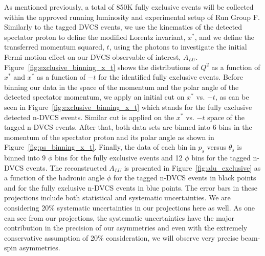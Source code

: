 As mentioned previously, a total of 850K fully exclusive events will be 
collected within the approved running luminosity and experimental setup of Run 
Group F. Similarly to the tagged DVCS events, we use the kinematics of the 
detected spectator proton to define the modified Lorentz invariant, $x^*$, and 
we define the transferred momentum squared, $t$, using the photons to 
investigate the initial Fermi motion effect on our DVCS observable of interest, 
$A_{LU}$. Figure~\ref{fig:exclusive_binning_x_t} shows the distributions of  
$Q^2$ as a function of  $x^*$ and  $x^{*}$ as a function of $-t$ for the 
identified fully exclusive events. Before binning our data in the space of the 
momentum and the polar angle of the detected spectator momentum, we apply an 
initial cut on $x^{*}$ vs. $-t$, as can be seen in 
Figure~\ref{fig:exclusive_binning_x_t} which stands for the fully exclusive 
detected n-DVCS events. Similar cut is applied on the $x^{*}$ vs. $-t$ space of 
the tagged n-DVCS events. After that, both data sets are binned into 6 bins in 
the momentum of the spectator proton and its polar angle as shown in 
Figure~\ref{fig:ps_binning_x_t}. Finally, the data of each bin in $p_s$ versus
$\theta_s$ is binned into 9 $\phi$ bins for the fully exclusive events and 12 
$\phi$ bins for the tagged n-DVCS events. The reconstructed $A_{LU}$ is 
presented in Figure~\ref{fig:alu_exclusive} as a function of the hadronic angle 
$\phi$ for the tagged n-DVCS events in black points and for the fully exclusive 
n-DVCS events in blue points. The error bars in these projections include both 
statistical and systematic uncertainties. We are considering 20\% systematic 
uncertainties in our projections here as well. As one can see from our 
projections, the systematic uncertainties have the major contribution in the 
precision of our asymmetries and even with the extremely conservative 
assumption of 20\% consideration, we will observe very precise beam-spin 
asymmetries.        

